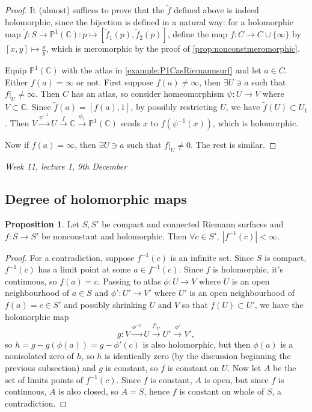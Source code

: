 \documentclass{article}
\newcommand{\C}{\mathbb{C}}
\newcommand{\p}{\mathbb{P}}
\theoremstyle{definition}
\newtheorem{prop}[defn]{Proposition}
\begin{document}
\begin{proof}
It (almost) suffices to prove that the $\widetilde f$ defined above is indeed holomorphic, since the bijection is defined in a natural way: for a holomorphic map $\widetilde f:S\rightarrow\p^1(\C):p\mapsto\left[\widetilde f_1(p),\widetilde f_2(p)\right]$, define the map $f:C\rightarrow C\cup\{\infty\}$ by $[x,y]\mapsto\frac{x}{y}$, which is meromorphic by the proof of \ref{prop:nonconstmeromorphic}.

Equip $\p^1(\C)$ with the atlas in \ref{example:P1CasRiemannsurf} and let $a\in C$. Either $f(a)=\infty$ or not. First suppose $f(a)\neq\infty$, then $\exists U\ni a$ such that $\left. f\right|_U\neq\infty$. Then $C$ has an atlas, so consider homeomorphism $\psi:U\rightarrow V$ where $V\subset\C$. Since $\widetilde f(a)=[f(a),1]$, by possibly restricting $U$, we have $\widetilde f(U)\subset U_1$. Then $V\xrightarrow{\psi^{-1}}U\xrightarrow{\widetilde f}\C\xrightarrow{\phi_1}\p^1(\C)$ sends $x$ to $f\left(\psi^{-1}(x)\right)$, which is holomorphic.

Now if $f(a)=\infty$, then $\exists U\ni a$ such that $\left. f\right|_U\neq 0$. The rest is similar.
\end{proof}

\begin{flushright}
\textit{Week 11, lecture 1, 9th December}
\end{flushright}

\subsection{Degree of holomorphic maps}
\begin{prop}
\label{prop:finpreim}
Let $S,S'$ be compact and connected Riemann surfaces and $f:S\rightarrow S'$ be nonconstant and holomorphic. Then $\forall c\in S',\ |f^{-1}(c)|<\infty$.
\end{prop}
\begin{proof}
For a contradiction, suppose $f^{-1}(c)$ is an infinite set. Since $S$ is compact, $f^{-1}(c)$ has a limit point at some $a\in f^{-1}(c)$. Since $f$ is holomorphic, it's continuous, so $f(a)=c$. Passing to atlas $\phi:U\rightarrow V$ where $U$ is an open neighbourhood of $a\in S$ and $\phi':U'\rightarrow V'$ where $U'$ is an open neighbourhood of $f(a)=c\in S'$ and possibly shrinking $U$ and $V$ so that $f(U)\subset U'$, we have the holomorphic map
\[
g:V\xrightarrow{\phi^{-1}} U\xrightarrow{\left. f\right|_U} U'\xrightarrow{\phi'} V',
\]
so $h=g-g(\phi(a))=g-\phi'(c)$ is also holomorphic, but then $\phi(a)$ is a nonisolated zero of $h$, so $h$ is identically zero (by the discussion beginning the previous subsection) and $g$ is constant, so $f$ is constant on $U$. Now let $A$ be the set of limits points of $f^{-1}(c)$. Since $f$ is constant, $A$ is open, but since $f$ is continuous, $A$ is also closed, so $A=S$, hence $f$ is constant on whole of $S$, a contradiction.
\end{proof}
\end{document}
